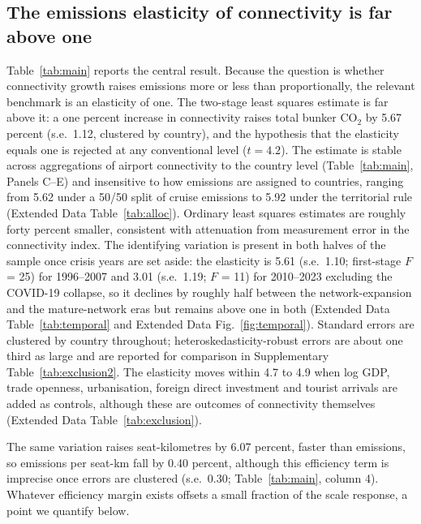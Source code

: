 \documentclass[12pt]{article}
\begin{document}
\subsection*{The emissions elasticity of connectivity is far above one}
Table~\ref{tab:main} reports the central result. Because the question is
whether connectivity growth raises emissions more or less than
proportionally, the relevant benchmark is an elasticity of one. The
two-stage least squares estimate is far above it: a one percent increase in
connectivity raises total bunker CO$_2$ by 5.67 percent (s.e.\ 1.12,
clustered by country), and the hypothesis that the elasticity equals one
is rejected at any conventional level ($t = 4.2$). The estimate is stable across aggregations of airport connectivity
to the country level (Table~\ref{tab:main}, Panels C--E) and insensitive
to how emissions are assigned to countries, ranging from 5.62 under a 50/50
split of cruise emissions to 5.92 under the territorial rule (Extended Data
Table~\ref{tab:alloc}). Ordinary least squares estimates are
roughly forty percent smaller, consistent with attenuation from measurement
error in the connectivity index. The identifying variation is present in
both halves of the sample once crisis years are set aside: the elasticity
is 5.61 (s.e.\ 1.10; first-stage $F$ = 25) for 1996--2007 and 3.01 (s.e.\
1.19; $F$ = 11) for 2010--2023 excluding the COVID-19 collapse, so it
declines by roughly half between the network-expansion and the
mature-network eras but remains above one in both (Extended Data
Table~\ref{tab:temporal} and Extended Data Fig.~\ref{fig:temporal}).
Standard errors are clustered by country throughout; heteroskedasticity-robust
errors are about one third as large and are reported for comparison in
Supplementary Table~\ref{tab:exclusion2}. The elasticity moves within 4.7
to 4.9 when log GDP, trade openness, urbanisation, foreign direct
investment and tourist arrivals are added as controls, although these are
outcomes of connectivity themselves (Extended Data
Table~\ref{tab:exclusion}).

The same variation raises seat-kilometres by 6.07 percent, faster than
emissions, so emissions per seat-km fall by 0.40 percent, although this
efficiency term is imprecise once errors are clustered (s.e.\ 0.30;
Table~\ref{tab:main}, column 4). Whatever efficiency margin exists offsets
a small fraction of the scale response, a point we quantify below.
\end{document}

